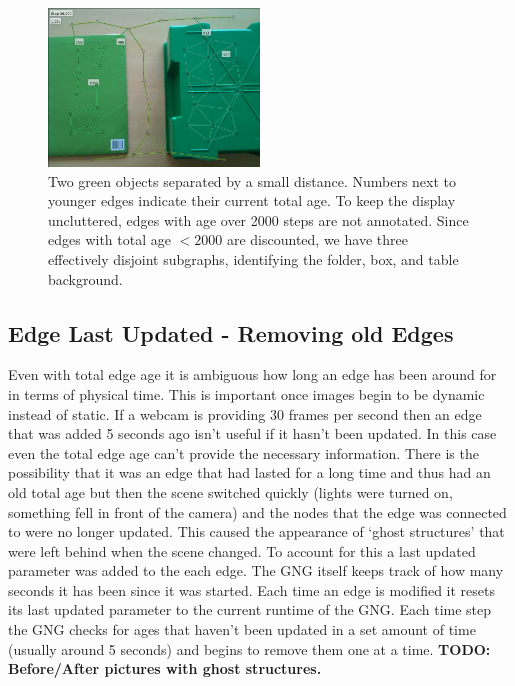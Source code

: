 \documentclass{article}
\renewcommand{\|}{\origbar} %
\begin{document}
\begin{figure}[h!]
  \centering
    \includegraphics[width=0.5\textwidth]{total_edge_age.png}

  \caption{Two green objects separated by a small distance. Numbers next to younger edges indicate their current total age. To keep the display uncluttered, edges with age over 2000 steps are not annotated. Since edges with total age $< 2000$ are discounted, we have three effectively disjoint subgraphs, identifying the folder, box, and table background.} 
  \label{fig:totalEdgeAge}
\end{figure}

\subsection{Edge Last Updated - Removing old Edges}

Even with total edge age it is ambiguous how long an edge has been around for in terms of physical time. This is important once images begin to be dynamic instead of static. If a webcam is providing 30 frames per second then an edge that was added 5 seconds ago isn't useful if it hasn't been updated. In this case even the total edge age can't provide the necessary information. There is the possibility that it was an edge that had lasted for a long time and thus had an old total age but then the scene switched quickly (lights were turned on, something fell in front of the camera) and the nodes that the edge was connected to were no longer updated. This caused the appearance of `ghost structures' that were left behind when the scene changed. To account for this a last updated parameter was added to the each edge. The GNG itself keeps track of how many seconds it has been since it was started. Each time an edge is modified it resets its last updated parameter to the current runtime of the GNG. Each time step the GNG checks for ages that haven't been updated in a set amount of time (usually around 5 seconds) and begins to remove them one at a time. {\bf TODO: Before/After pictures with ghost structures.}
\end{document}
